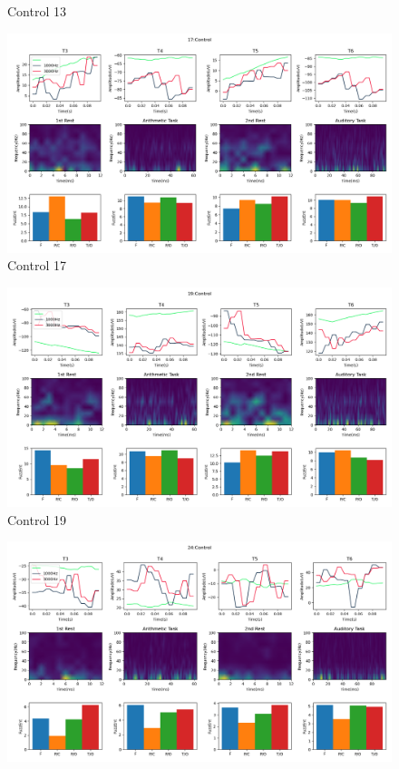 \documentclass[10pt]{article}
\begin{document}
\begin{landscape}
\begin{figure}
  \caption{Control 13}
  \label{fig:control_13}
\end{figure}
\clearpage
\begin{figure}
  \includegraphics[width=7.2in]{figures/17.png}
  \caption{Control 17}
  \label{fig:control_17}
\end{figure}
\clearpage
\begin{figure}
  \includegraphics[width=7.2in]{figures/19.png}
  \caption{Control 19}
  \label{fig:control_19}
\end{figure}
\clearpage
\begin{figure}
  \includegraphics[width=7.2in]{figures/24.png}

\end{figure}
\end{landscape}
\end{document}
